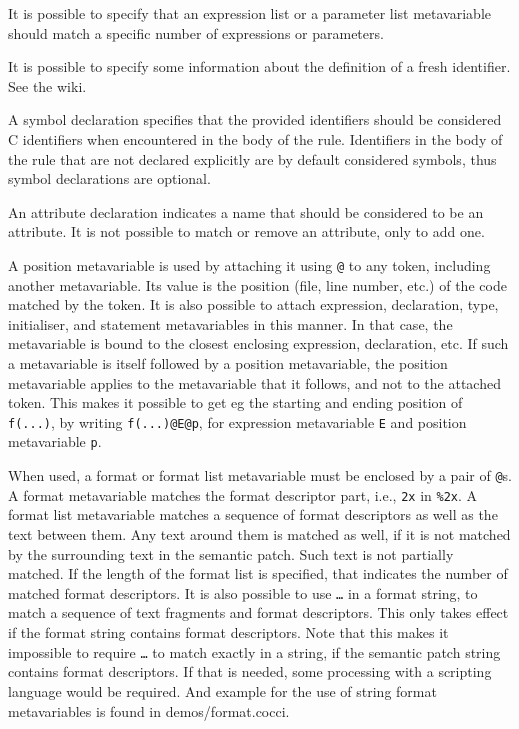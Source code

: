 It is possible to specify that an expression list or a parameter list
metavariable should match a specific number of expressions or parameters.

It is possible to specify some information about the definition of a fresh
identifier.  See the wiki.

A symbol declaration specifies that the provided identifiers should be
considered C identifiers when encountered in the body of the rule.
Identifiers in the body of the rule that are not declared explicitly are
by default considered symbols, thus symbol declarations are optional.

An attribute declaration indicates a name that should be considered to be
an attribute.  It is not possible to match or remove an attribute, only to
add one.

A position metavariable is used by attaching it using \texttt{@} to any
token, including another metavariable.  Its value is the position (file,
line number, etc.) of the code matched by the token.  It is also possible
to attach expression, declaration, type, initialiser, and statement
metavariables in this manner.  In that case, the metavariable is bound to
the closest enclosing expression, declaration, etc.  If such a metavariable
is itself followed by a position metavariable, the position metavariable
applies to the metavariable that it follows, and not to the attached token.
This makes it possible to get eg the starting and ending position of {\tt
  f(...)}, by writing {\tt f(...)@E@p}, for expression metavariable {\tt E}
and position metavariable {\tt p}.

When used, a format or format list metavariable must be enclosed by a pair
of \texttt{@}s.  A format metavariable matches the format descriptor part,
i.e., \texttt{2x} in \texttt{\%2x}.  A format list metavariable matches a
sequence of format descriptors as well as the text between them.  Any text
around them is matched as well, if it is not matched by the surrounding
text in the semantic patch.  Such text is not partially matched.  If the
length of the format list is specified, that indicates the number of
matched format descriptors.  It is also possible to use \texttt{\ldots} in
a format string, to match a sequence of text fragments and format
descriptors.  This only takes effect if the format string contains format
descriptors.  Note that this makes it impossible to require \texttt{\ldots}
to match exactly in a string, if the semantic patch string contains format
descriptors.  If that is needed, some processing with a scripting language
would be required.  And example for the use of string format metavariables
is found in demos/format.cocci.

